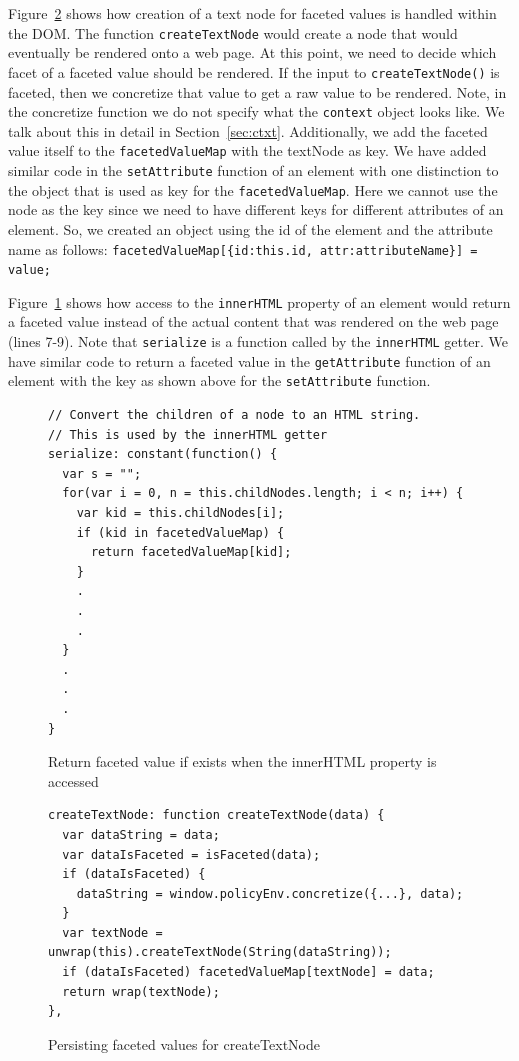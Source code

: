 Figure~\ref{fig:createTextNode} shows how creation of a text node for faceted values
is handled within the DOM. The function \texttt{createTextNode} would create a
node that would eventually be rendered onto a web page. At this point, we need to
decide which facet of a faceted value should be rendered. If the input to
\texttt{createTextNode()} is faceted, then we concretize that value to get a raw
value to be rendered. Note, in the concretize function we do not specify what the
\texttt{context} object looks like. We talk about this in detail in
Section~\ref{sec:ctxt}. Additionally, we add the faceted value itself to the
\texttt{facetedValueMap} with the textNode as key. We have added similar code in
the \texttt{setAttribute} function of an element with one distinction to the object
that is used as key for the \texttt{facetedValueMap}. Here we cannot use the node
as the key since we need to have different keys for different attributes of an element.
So, we created an object using the id of the element and the attribute name as follows:
\indent\texttt{facetedValueMap[\{id:this.id, attr:attributeName\}] = value;}
\noindent

Figure~\ref{fig:innerHTML} shows how access to the \texttt{innerHTML} property of
an element would return a faceted value instead of the actual content that was
rendered on the web page (lines 7-9). Note that \texttt{serialize} is a function
called by the \texttt{innerHTML} getter. We have similar code to return a faceted
value in the \texttt{getAttribute} function of an element with the key as shown
above for the \texttt{setAttribute} function.

\begin{figure}
  \begin{lstlisting}
// Convert the children of a node to an HTML string.
// This is used by the innerHTML getter
serialize: constant(function() {
  var s = "";
  for(var i = 0, n = this.childNodes.length; i < n; i++) {
    var kid = this.childNodes[i];
    if (kid in facetedValueMap) {
      return facetedValueMap[kid];
    }
    .
    .
    .
  }
  .
  .
  .
}
  \end{lstlisting}
  \caption{Return faceted value if exists when the innerHTML property is accessed}
  \label{fig:innerHTML}
\end{figure}

\begin{figure}
  \begin{lstlisting}
createTextNode: function createTextNode(data) {
  var dataString = data;
  var dataIsFaceted = isFaceted(data);
  if (dataIsFaceted) {
    dataString = window.policyEnv.concretize({...}, data);
  }
  var textNode = unwrap(this).createTextNode(String(dataString));
  if (dataIsFaceted) facetedValueMap[textNode] = data;
  return wrap(textNode);
},
  \end{lstlisting}
  \caption{Persisting faceted values for createTextNode}
  \label{fig:createTextNode}
\end{figure}


